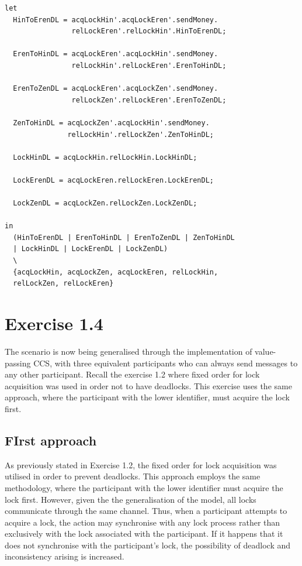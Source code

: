 \documentclass{report}
\begin{document}
\begin{verbatim}
let
  HinToErenDL = acqLockHin'.acqLockEren'.sendMoney.
                relLockEren'.relLockHin'.HinToErenDL;

  ErenToHinDL = acqLockEren'.acqLockHin'.sendMoney.
                relLockHin'.relLockEren'.ErenToHinDL;

  ErenToZenDL = acqLockEren'.acqLockZen'.sendMoney.
                relLockZen'.relLockEren'.ErenToZenDL;
  
  ZenToHinDL = acqLockZen'.acqLockHin'.sendMoney.
               relLockHin'.relLockZen'.ZenToHinDL;

  LockHinDL = acqLockHin.relLockHin.LockHinDL;
  
  LockErenDL = acqLockEren.relLockEren.LockErenDL;
  
  LockZenDL = acqLockZen.relLockZen.LockZenDL;

in
  (HinToErenDL | ErenToHinDL | ErenToZenDL | ZenToHinDL
  | LockHinDL | LockErenDL | LockZenDL) 
  \ 
  {acqLockHin, acqLockZen, acqLockEren, relLockHin, 
  relLockZen, relLockEren}
\end{verbatim}

\section*{Exercise 1.4}

The scenario is now being generalised through the implementation of value-passing CCS, with three equivalent participants who can always send messages to any other participant. Recall the exercise 1.2 where fixed order for lock acquisition was used in order not to have deadlocks. This exercise uses the same approach, where the participant with the lower identifier, must acquire the lock first.

\subsection*{FIrst approach}

As previously stated in Exercise 1.2, the fixed order for lock acquisition was utilised in order to prevent deadlocks. This approach employs the same methodology, where the participant with the lower identifier must acquire the lock first. However, given the the generalisation of the model, all locks communicate through the same channel. Thus, when a participant attempts to acquire a lock, the action may synchronise with any lock process rather than exclusively with the lock associated with the participant. If it happens that it does not synchronise with the participant's lock, the possibility of deadlock and inconsistency arising is increased.
\end{document}
